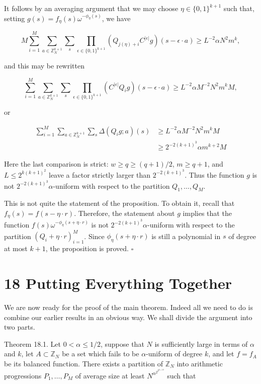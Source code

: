 \documentclass[10pt]{article}
\begin{document}
It follows by an averaging argument that we may choose $\eta \in\{0,1\}^{k+1}$ such that, setting $g(s)=f_{\eta}(s) \omega^{-\phi_{\eta}(s)}$, we have

$$
M \sum_{i=1}^{M} \sum_{a \in \mathbb{Z}_{N}^{k+1}} \sum_{s} \prod_{\epsilon \in\{0,1\}^{k+1}}\left(Q_{j(\eta)+i} C^{|\epsilon|} g\right)(s-\epsilon \cdot a) \geqslant L^{-2} \alpha N^{2} m^{k},
$$

and this may be rewritten

$$
\sum_{i=1}^{M} \sum_{a \in \mathbb{Z}_{N}^{k+1}} \sum_{s} \prod_{\epsilon \in\{0,1\}^{k+1}}\left(C^{|\epsilon|} Q_{i} g\right)(s-\epsilon \cdot a) \geqslant L^{-2} \alpha M^{-2} N^{2} m^{k} M,
$$

or

$$
\begin{aligned}
\sum_{i=1}^{M} \sum_{a \in \mathbb{Z}_{N}^{k+1}} \sum_{s} \Delta\left(Q_{i} g ; a\right)(s) & \geqslant L^{-2} \alpha M^{-2} N^{2} m^{k} M \\
& \geqslant 2^{-2(k+1)^{3}} \alpha m^{k+2} M
\end{aligned}
$$

Here the last comparison is strict: $w\geqslant q\geqslant(q+1)/2$, $m\geqslant q+1$, and $L\leqslant2^{k(k+1)^2}$ leave a factor strictly larger than $2^{-2(k+1)^3}$.  Thus the function $g$ is not $2^{-2(k+1)^{3}} \alpha$-uniform with respect to the partition $Q_{1}, \ldots, Q_{M}$.

This is not quite the statement of the proposition. To obtain it, recall that $f_{\eta}(s)=f(s-\eta \cdot r)$. Therefore, the statement about $g$ implies that the function $f(s) \omega^{-\phi_{\eta}(s+\eta \cdot r)}$ is not $2^{-2(k+1)^{3}} \alpha$-uniform with respect to the partition $\left(Q_{i}+\eta \cdot r\right)_{i=1}^{M}$. Since $\phi_{\eta}(s+\eta \cdot r)$ is still a polynomial in $s$ of degree at most $k+1$, the proposition is proved. \(\square\)

\section*{18 Putting Everything Together}
We are now ready for the proof of the main theorem. Indeed all we need to do is combine our earlier results in an obvious way. We shall divide the argument into two parts.

Theorem 18.1. Let $0<\alpha \leqslant 1 / 2$, suppose that $N$ is sufficiently large in terms of $\alpha$ and $k$, let $A \subset \mathbb{Z}_{N}$ be a set which fails to be $\alpha$-uniform of degree $k$, and let $f=f_A$ be its balanced function. There exists a partition of $\mathbb{Z}_{N}$ into arithmetic progressions $P_{1}, \ldots, P_{M}$ of average size at least $N^{\alpha^{2^{2^{k+10}}}}$ such that
\end{document}
